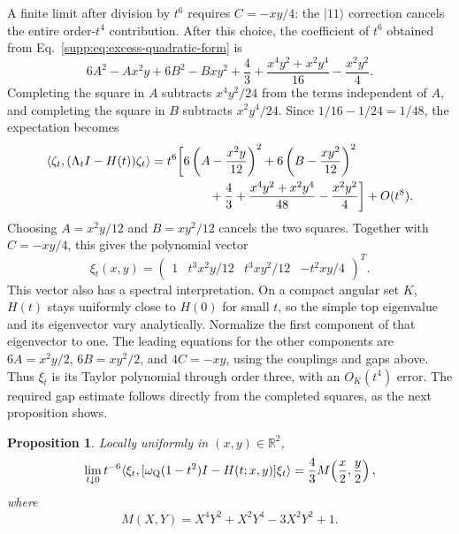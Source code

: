 \documentclass[aps,prl,onecolumn,10pt,superscriptaddress,nofootinbib,longbibliography]{revtex4-2}
\newtheorem{proposition}[theorem]{Proposition}
\theoremstyle{remark}
\newcommand{\R}{\mathbb R}
\begin{document}
A finite limit after division by $t^6$ requires $C=-xy/4$: the $|11\rangle$ correction cancels the entire order-$t^4$ contribution. After this choice, the coefficient of $t^6$ obtained from Eq.~\eqref{supp:eq:excess-quadratic-form} is
\[
6A^2-Ax^2y+6B^2-Bxy^2
+\frac43+\frac{x^4y^2+x^2y^4}{16}-\frac{x^2y^2}{4}.
\]
Completing the square in $A$ subtracts $x^4y^2/24$ from the terms independent of $A$, and completing the square in $B$ subtracts $x^2y^4/24$. Since $1/16-1/24=1/48$, the expectation becomes
\begin{align}
\langle\zeta_t,(\Lambda_tI-H(t))\zeta_t\rangle
={}&t^6\biggl[
6\left(A-\frac{x^2y}{12}\right)^2
+6\left(B-\frac{xy^2}{12}\right)^2
\nonumber\\
&\hspace{12mm}+\frac43+\frac{x^4y^2+x^2y^4}{48}-\frac{x^2y^2}{4}
\biggr]+O(t^8).
\label{supp:eq:gap-completed-squares}
\end{align}
Choosing $A=x^2y/12$ and $B=xy^2/12$ cancels the two squares. Together with $C=-xy/4$, this gives the polynomial vector
\begin{equation}
\xi_t(x,y)=
\begin{pmatrix}
1&t^3x^2y/12&t^3xy^2/12&-t^2xy/4
\end{pmatrix}^{T}.
\label{supp:eq:scaled-test-vector}
\end{equation}
This vector also has a spectral interpretation. On a compact angular set $K$, $H(t)$ stays uniformly close to $H(0)$ for small $t$, so the simple top eigenvalue and its eigenvector vary analytically. Normalize the first component of that eigenvector to one. The leading equations for the other components are $6A=x^2y/2$, $6B=xy^2/2$, and $4C=-xy$, using the couplings and gaps above. Thus $\xi_t$ is its Taylor polynomial through order three, with an $O_K(t^4)$ error. The required gap estimate follows directly from the completed squares, as the next proposition shows.

\begin{proposition}
\label{supp:prop:motzkin-limit}
Locally uniformly in $(x,y)\in\R^2$,
\begin{equation}
\lim_{t\downarrow0}t^{-6}
\langle\xi_t,[\omega_{\rm Q}(1-t^2)I-H(t;x,y)]\xi_t\rangle
=\frac43M\!\left(\frac{x}{2},\frac{y}{2}\right),
\label{supp:eq:motzkin-limit}
\end{equation}
where
\begin{equation}
M(X,Y)=X^4Y^2+X^2Y^4-3X^2Y^2+1.
\label{supp:eq:Motzkin-polynomial}
\end{equation}
\end{proposition}
\end{document}
